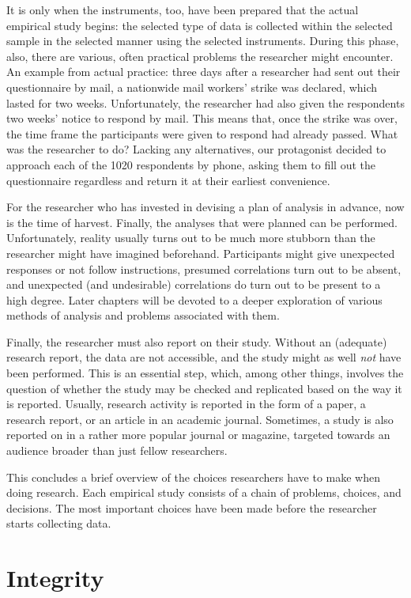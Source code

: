 \documentclass[
]{book}
\begin{document}
It is only when the instruments, too, have been prepared that the actual empirical study begins: the selected type of data is collected within the selected sample in the selected manner using the selected instruments. During this phase, also, there are various, often practical problems the researcher might encounter. An example from actual practice: three days after a researcher had sent out their questionnaire by mail, a nationwide mail workers' strike was declared, which lasted for two weeks. Unfortunately, the researcher had also given the respondents two weeks' notice to respond by mail. This means that, once the strike was over, the time frame the participants were given to respond had already passed. What was the researcher to do? Lacking any alternatives, our protagonist decided to approach each of the 1020 respondents by phone, asking them to fill out the questionnaire regardless and return it at their earliest convenience.

For the researcher who has invested in devising a plan of analysis in advance, now is the time of harvest. Finally, the analyses that were planned can be performed. Unfortunately, reality usually turns out to be much more stubborn than the researcher might have imagined beforehand. Participants might give unexpected responses or not follow instructions, presumed correlations turn out to be absent, and unexpected (and undesirable) correlations do turn out to be present to a high degree. Later chapters will be devoted to a deeper exploration of various methods of analysis and problems associated with them.

Finally, the researcher must also report on their study. Without an (adequate) research report, the data are not accessible, and the study might as well \emph{not} have been performed. This is an essential step, which, among other things, involves the question of whether the study may be checked and replicated based on the way it is reported. Usually, research activity is reported in the form of a paper, a research report, or an article in an academic journal. Sometimes, a study is also reported on in a rather more popular journal or magazine, targeted towards an audience broader than just fellow researchers.

This concludes a brief overview of the choices researchers have to make when doing research. Each empirical study consists of a chain of problems, choices, and decisions. The most important choices have been made before the researcher starts collecting data.

\chapter{Integrity}\label{ch-integrity}
\end{document}

